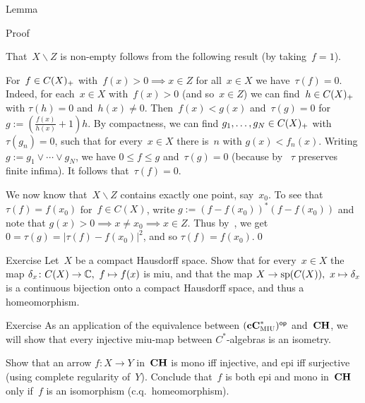 \documentclass[a]{subfiles}
\begin{document}
\begin{parsec}
\begin{point}{Lemma}
\begin{point}{Proof}
\begin{point}
That~$X\backslash Z$ is non-empty
follows from the following result (by taking~$f=1$).
\end{point}
\begin{point}%
For~$f\in C(X)_{+}$
with~$f(x)> 0 \implies x\in Z$ for all~$x\in X$
we have~$\tau(f)=0$.
Indeed, for each~$x\in X$ with~$f(x)>0$
(and so~$x\in Z$)
we can find~$h\in C(X)_{+}$
with $\tau(h)=0$ and~$h(x)\neq 0$.
Then~$f(x)< g(x)$
and~$\tau(g)=0$
for $g:=(\frac{f(x)}{h(x)}+1)h$.
By compactness,
we can find $g_1,\dotsc,g_N\in C(X)_{+}$
with~$\tau(g_n)=0$,
such that for every~$x\in X$
there is~$n$ with $g(x)<f_n(x)$.
Writing $g:=g_1\vee \dotsb \vee g_N$,
we have $0\leq f\leq g$ and~$\tau(g)=0$
(because by~
$\tau$ preserves finite infima).
It follows that~$\tau(f)=0$.
\end{point}
\begin{point}%
We now know that~$X\backslash Z$ contains exactly
one point, say~$x_0$.
To see that~$\tau(f)=f(x_0)$
for~$f\in C(X)$,
write $g:=(f-f(x_0))^*(f-f(x_0))$
and note that $g(x)>0\implies x\neq x_0\implies  x\in Z$.
Thus by~,
we get $0=\tau(g)=\left|\tau(f)-f(x_0)\right|^2$,
and so $\tau(f)=f(x_0)$.\qed
\end{point}
\end{point}
\end{point}
\begin{point}{Exercise}%
Let~$X$ be a compact Hausdorff space.
Show that for every~$x\in X$
the map $\delta_x\colon C(X)\to \mathbb{C},\ f\mapsto f(x)$
is miu,
and that the map $X\to \mathrm{sp}(C(X)),\ x\mapsto \delta_x$
is a continuous bijection
onto a compact Hausdorff space,
and thus a homeomorphism.
\end{point}
\begin{point}{Exercise}%
As an application of the equivalence
between ${(\mathbf{cC}^*_{\text{\textsc{MIU}}})}{^{\mathsf{op}}}$
and~$\mathbf{CH}$,
we will show that every injective miu-map
between $C^*$-algebras
is an isometry.

Show that an arrow $f\colon X\to Y$
in~$\mathbf{CH}$ is mono iff injective, and epi iff surjective
(using complete regularity of~$Y$).
Conclude that~$f$ is both epi and mono in~$\mathbf{CH}$
only if~$f$ is an isomorphism (c.q.~homeomorphism).


\end{point}
\end{parsec}
\end{document}
